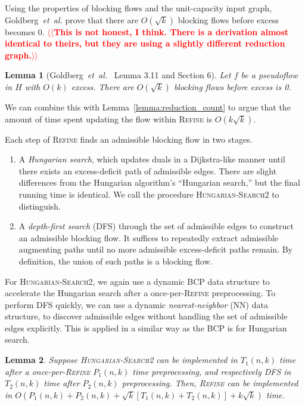 \documentclass[11pt]{article}
\makeatletter
\def\etal{\textsl{et~al.}}
\theoremstyle{plain}
\newtheorem{lemma}{Lemma}[section]
\numberwithin{figure}{section}
\def\n@te#1{\textsf{\boldmath \textbf{$\langle\!\langle$#1$\rangle\!\rangle$}}\leavevmode}
\def\note#1{\textcolor{red}{\n@te{#1}}}
\makeatother
\begin{document}
Using the properties of blocking flows and the unit-capacity input graph,
Goldberg~{\etal} prove that there are $O(\sqrt{k})$ blocking flows before
excess becomes 0.
\note{This is not honest, I think. There is a derivation almost identical to theirs, but they are using a slightly different reduction graph.}

\begin{lemma}[Goldberg~{\etal}~\cite{GHKT17} Lemma 3.11 and Section 6]
Let $f$ be a pseudoflow in $H$ with $O(k)$ excess.
There are $O(\sqrt{k})$ blocking flows before excess is 0.
\end{lemma}

We can combine this with Lemma~\ref{lemma:reduction_count} to argue that the
amount of time spent updating the flow within \textsc{Refine} is
$O(k\sqrt{k})$.

Each step of \textsc{Refine} finds an admissible blocking flow in two stages.
\begin{enumerate}
\item A \emph{Hungarian search}, which updates duals in a Dijkstra-like
	manner until there exists an excess-deficit path of admissible edges.
	There are slight differences from the Hungarian algorithm's ``Hungarian
	search,'' but the final running time is identical.
	We call the procedure \textsc{Hungarian-Search2} to distinguish.

\item A \emph{depth-first search} (\textsc{DFS}) through the set of admissible
	edges to construct an admissible blocking flow.
	It suffices to repeatedly extract admissible augmenting paths until
	no more admissible excess-deficit paths remain.
	By definition, the union of such paths is a blocking flow.
\end{enumerate}
For \textsc{Hungarian-Search2}, we again use a dynamic BCP data structure to
accelerate the Hungarian search after a once-per-\textsc{Refine} preprocessing.
To perform \textsc{DFS} quickly, we can use a dynamic \emph{nearest-neighbor}
(NN) data structure, to discover admissible edges without handling the set of
admissible edges explicitly.
This is applied in a similar way as the BCP is for Hungarian search.

\begin{lemma}
Suppose \textsc{Hungarian-Search2} can be implemented in $T_1(n, k)$ time after
a once-per-\textsc{Refine} $P_1(n, k)$ time preprocessing, and respectively
\textsc{DFS} in $T_2(n, k)$ time after $P_2(n, k)$ preprocessing.
Then, \textsc{Refine} can be implemented in
$O(P_1(n, k) + P_2(n, k) + \sqrt{k}[T_1(n, k) + T_2(n, k)] + k\sqrt{k})$ time.
\end{lemma}
\end{document}
